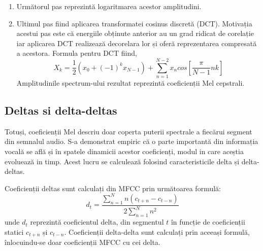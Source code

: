 \documentclass[a4paper,12pt]{book}
\begin{document}
\begin{enumerate}
\begin{equation*}
\begin{cases}
							\frac{k-f(m-1)}{f(m) - f(m-1)}&\quad f(m-1)\leq k\leq f(m) \\[5pt]
							\frac{f(m+1)-k}{f(m+1) - f(m)}&\quad f(m)\leq k\leq f(m+1) \\[3pt]
							\quad \quad 0&\quad k>f(m+1)
							\end{cases}
						\end{equation*}
						unde $m$ este numărul frecvenței scalate, iar $k$ este frecvența curentă din spectrum. \newline
						Filtrele triunghiulare sunt înmulțite apoi cu "power spectrum"-ul obținut la pasul anterior și se obțin astfel amplitudinile din fiecare filtru Mel.
						\item Următorul pas reprezintă logaritmarea acestor amplitudini.
						\item Ultimul pas fiind aplicarea transformatei cosinus discretă (DCT). Motivația acestui pas este că energiile obținute anterior au un grad ridicat de corelație iar aplicarea DCT realizează decorelara lor și oferă reprezentarea compresată a acestora.
						Formula pentru DCT fiind,
						\begin{equation*}
							X_k = \frac{1}{2}(x_0 + (-1)^k x_{N-1}) + \sum_{n=1}^{N-2} x_n cos[\frac{\pi}{N-1}nk]
						\end{equation*}
						Amplitudinile spectrum-ului rezultat reprezintă coeficienții Mel cepstrali.
				\end{enumerate} \par
				\subsection{Deltas si delta-deltas}
					Totuși, coeficienții Mel descriu doar coperta puterii spectrale a fiecărui segment din semnalul audio. S-a demonstrat empiric că o parte importantă din informația vocală se află și în spatele dinamicii acestor coeficienți, modul in care aceștia evoluează in timp. Acest lucru se calculează folosind caracteristicile delta și delta-deltas. \par Coeficienții deltas sunt calculați din MFCC prin următoarea formulă:
					\begin{equation*}
						d_t = \frac{\sum_{n=1}^{N} n(c_{t+n}-c_{t-n})}{2\sum_{n=1}^{N}n^2}
					\end{equation*}
					unde $d_t$ reprezintă coeficientul delta, din segmentul $t$  în funcție de coeficienții statici $c_{t+n}$ și $c_{t-n}$. 
					Coeficienții delta-delta sunt calculați prin aceeași formulă, înlocuindu-se doar coeficienții MFCC cu cei delta. \par
				
\end{document}
